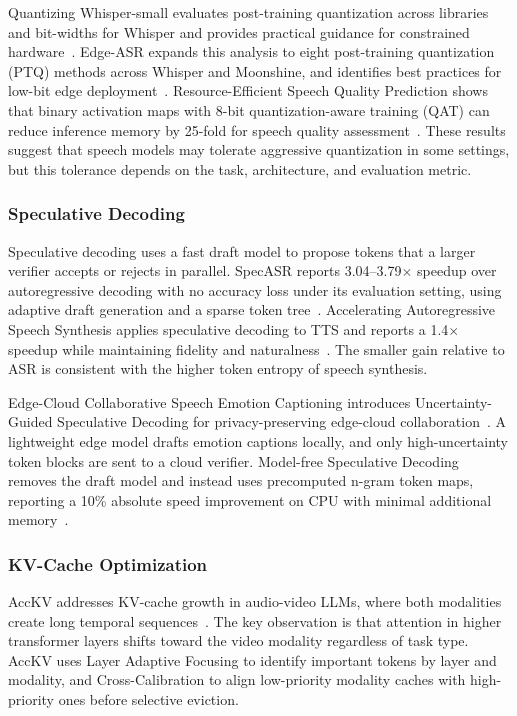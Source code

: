 Quantizing Whisper-small evaluates post-training quantization across libraries and bit-widths for Whisper and provides practical guidance for constrained hardware~\citep{sohler2025quantizingwhisper}. Edge-ASR expands this analysis to eight post-training quantization (PTQ) methods across Whisper and Moonshine, and identifies best practices for low-bit edge deployment~\citep{feng2025edgeasr}. Resource-Efficient Speech Quality Prediction shows that binary activation maps with 8-bit quantization-aware training (QAT) can reduce inference memory by 25-fold for speech quality assessment~\citep{nilsson2024speechquality}. These results suggest that speech models may tolerate aggressive quantization in some settings, but this tolerance depends on the task, architecture, and evaluation metric.

\subsubsection{Speculative Decoding}

Speculative decoding uses a fast draft model to propose tokens that a larger verifier accepts or rejects in parallel. SpecASR reports 3.04--3.79$\times$ speedup over autoregressive decoding with no accuracy loss under its evaluation setting, using adaptive draft generation and a sparse token tree~\citep{wei2025specasr}. Accelerating Autoregressive Speech Synthesis applies speculative decoding to TTS and reports a 1.4$\times$ speedup while maintaining fidelity and naturalness~\citep{lin2025speechspeculative}. The smaller gain relative to ASR is consistent with the higher token entropy of speech synthesis.

Edge-Cloud Collaborative Speech Emotion Captioning introduces Uncertainty-Guided Speculative Decoding for privacy-preserving edge-cloud collaboration~\citep{xue2026edgecloudsec}. A lightweight edge model drafts emotion captions locally, and only high-uncertainty token blocks are sent to a cloud verifier. Model-free Speculative Decoding removes the draft model and instead uses precomputed n-gram token maps, reporting a 10\% absolute speed improvement on CPU with minimal additional memory~\citep{ho2025modelfreeasr}.

\subsubsection{KV-Cache Optimization}

AccKV addresses KV-cache growth in audio-video LLMs, where both modalities create long temporal sequences~\citep{jiang2025acckv}. The key observation is that attention in higher transformer layers shifts toward the video modality regardless of task type. AccKV uses Layer Adaptive Focusing to identify important tokens by layer and modality, and Cross-Calibration to align low-priority modality caches with high-priority ones before selective eviction.

